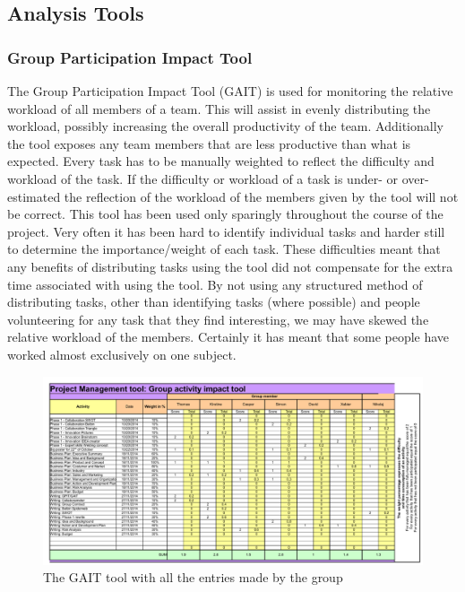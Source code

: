 \subsection{Analysis Tools}
\subsubsection{Group Participation Impact Tool}
The Group Participation Impact Tool (GAIT) is used for monitoring the relative workload of all members of a team. 
This will assist in evenly distributing the workload, possibly increasing the overall productivity of the team. 
Additionally the tool exposes any team members that are less productive than what is expected. 
Every task has to be manually weighted to reflect the difficulty and workload of the task. 
If the difficulty or workload of a task is under- or over-estimated the reflection of the workload of the members given by the tool will not be correct.
This tool has been used only sparingly throughout the course of the project. 
Very often it has been hard to identify individual tasks and harder still to determine the importance/weight of each task. 
These difficulties meant that any benefits of distributing tasks using the tool did not compensate for the extra time associated with using the tool. 
By not using any structured method of distributing tasks, other than identifying tasks (where possible) and people volunteering for any task that they find interesting, we may have skewed the relative workload of the members. 
Certainly it has meant that some people have worked almost exclusively on one subject.
\begin{landscape}
	\begin{figure}[h!]
		\includegraphics[scale=1.25]{./graphics/GAIT}
		\caption{The GAIT tool with all the entries made by the group}
		\label{fig:GAIT}
	\end{figure}
\end{landscape}
